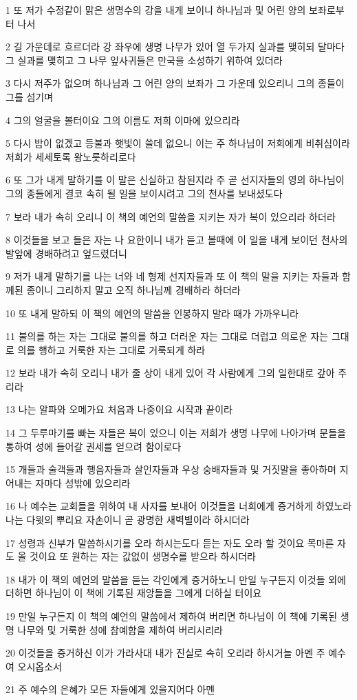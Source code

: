 \par 1 또 저가 수정같이 맑은 생명수의 강을 내게 보이니 하나님과 및 어린 양의 보좌로부터 나서
\par 2 길 가운데로 흐르더라 강 좌우에 생명 나무가 있어 열 두가지 실과를 맺히되 달마다 그 실과를 맺히고 그 나무 잎사귀들은 만국을 소성하기 위하여 있더라
\par 3 다시 저주가 없으며 하나님과 그 어린 양의 보좌가 그 가운데 있으리니 그의 종들이 그를 섬기며
\par 4 그의 얼굴을 볼터이요 그의 이름도 저희 이마에 있으리라
\par 5 다시 밤이 없겠고 등불과 햇빛이 쓸데 없으니 이는 주 하나님이 저희에게 비취심이라 저희가 세세토록 왕노릇하리로다
\par 6 또 그가 내게 말하기를 이 말은 신실하고 참된지라 주 곧 선지자들의 영의 하나님이 그의 종들에게 결코 속히 될 일을 보이시려고 그의 천사를 보내셨도다
\par 7 보라 내가 속히 오리니 이 책의 예언의 말씀을 지키는 자가 복이 있으리라 하더라
\par 8 이것들을 보고 들은 자는 나 요한이니 내가 듣고 볼때에 이 일을 내게 보이던 천사의 발앞에 경배하려고 엎드렸더니
\par 9 저가 내게 말하기를 나는 너와 네 형제 선지자들과 또 이 책의 말을 지키는 자들과 함께된 종이니 그리하지 말고 오직 하나님께 경배하라 하더라
\par 10 또 내게 말하되 이 책의 예언의 말씀을 인봉하지 말라 때가 가까우니라
\par 11 불의를 하는 자는 그대로 불의를 하고 더러운 자는 그대로 더럽고 의로운 자는 그대로 의를 행하고 거룩한 자는 그대로 거룩되게 하라
\par 12 보라 내가 속히 오리니 내가 줄 상이 내게 있어 각 사람에게 그의 일한대로 갚아 주리라
\par 13 나는 알파와 오메가요 처음과 나중이요 시작과 끝이라
\par 14 그 두루마기를 빠는 자들은 복이 있으니 이는 저희가 생명 나무에 나아가며 문들을 통하여 성에 들어갈 권세를 얻으려 함이로다
\par 15 개들과 술객들과 행음자들과 살인자들과 우상 숭배자들과 및 거짓말을 좋아하며 지어내는 자마다 성밖에 있으리라
\par 16 나 예수는 교회들을 위하여 내 사자를 보내어 이것들을 너희에게 증거하게 하였노라 나는 다윗의 뿌리요 자손이니 곧 광명한 새벽별이라 하시더라
\par 17 성령과 신부가 말씀하시기를 오라 하시는도다 듣는 자도 오라 할 것이요 목마른 자도 올 것이요 또 원하는 자는 값없이 생명수를 받으라 하시더라
\par 18 내가 이 책의 예언의 말씀을 듣는 각인에게 증거하노니 만일 누구든지 이것들 외에 더하면 하나님이 이 책에 기록된 재앙들을 그에게 더하실 터이요
\par 19 만일 누구든지 이 책의 예언의 말씀에서 제하여 버리면 하나님이 이 책에 기록된 생명 나무와 및 거룩한 성에 참예함을 제하여 버리시리라
\par 20 이것들을 증거하신 이가 가라사대 내가 진실로 속히 오리라 하시거늘 아멘 주 예수여 오시옵소서
\par 21 주 예수의 은혜가 모든 자들에게 있을지어다 아멘



